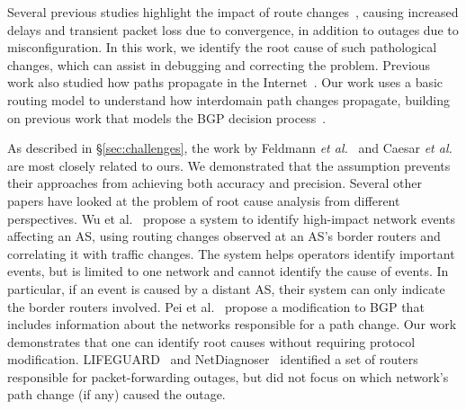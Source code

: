  Several previous studies highlight
the impact of route
changes~\cite{labovitz00,feamster,beacons,feamster07,ratul}, \eg causing
increased delays and transient packet loss due to convergence, in
addition to outages due to misconfiguration. In this work, we identify
the root cause of such pathological changes, which can assist in
debugging and correcting the problem. Previous work also studied how
paths propagate in the Internet~\cite{griffin-wilfgong-sheperd,wedgies}.
Our work uses a basic routing model to understand how interdomain path changes
propagate, building on previous work that models the
BGP decision process~\cite{gao}.  

 As described in
\S\ref{sec:challenges}, the work by Feldmann \emph{et
al.}~\cite{feldman} and Caesar \emph{et al.}~\cite{caesar} are most
closely related to ours. We demonstrated that the \feldmann assumption
prevents their approaches from achieving both accuracy and precision.
Several other papers have looked at the problem of root cause analysis
from different perspectives.  Wu et al.~\cite{needle} propose a system
to identify high-impact network events affecting an AS, using routing
changes observed at an AS's border routers and correlating it with
traffic changes.  The system helps operators identify important events,
but is limited to one network and cannot identify the cause of events.
In particular, if an event is caused by a distant AS, their system can
only indicate the border routers involved. Pei et al.~\cite{BGP-RCN}
propose a modification to BGP that includes information about the
networks responsible for a path change. Our work demonstrates that one
can identify root causes without requiring protocol modification.
LIFEGUARD~\cite{lifeguard} and NetDiagnoser~\cite{netdiagnoser}
identified a set of routers responsible for packet-forwarding outages,
but did not focus on which network's path change (if any) caused the
outage.  




